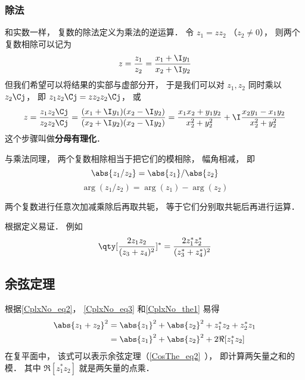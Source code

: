 \subsubsection{除法}
和实数一样， 复数的除法定义为乘法的逆运算． 令 $z_1 = z z_2$ （$z_2 \ne 0$）， 则两个复数相除可以记为
\begin{equation}
z = \frac{z_1}{z_2} = \frac{x_1 + \I y_1}{x_2 + \I y_2}
\end{equation}
但我们希望可以将结果的实部与虚部分开， 于是我们可以对 $z_1, z_2$ 同时乘以 $z_2\Cj$， 即 $z_1 z_2\Cj  = z z_2 z_2\Cj$， 或
\begin{equation}\label{CplxNo_eq7}
z = \frac{z_1 z_2\Cj}{z_2 z_2\Cj}
= \frac{(x_1 + \I y_1)(x_2 - \I y_2)}{(x_2 + \I y_2)(x_2 - \I y_2)}
= \frac{x_1 x_2 + y_1 y_2}{x_2^2 + y_2^2} + \I \frac{x_2 y_1 - x_1 y_2}{x_2^2 + y_2^2}
\end{equation}
这个步骤叫做\textbf{分母有理化}．

与乘法同理， 两个复数相除相当于把它们的模相除， 幅角相减， 即
\begin{equation}
\abs{z_1/z_2} = \abs{z_1}/\abs{z_2}
\end{equation}
\begin{equation}
\arg(z_1/z_2) = \arg(z_1) - \arg(z_2)
\end{equation}

\begin{theorem}{}\label{CplxNo_the1}
两个复数进行任意次加减乘除后再取共轭， 等于它们分别取共轭后再进行运算．
\end{theorem}
根据定义易证． 例如
\begin{equation}
\qty[\frac{2 z_1 z_2}{(z_3 + z_4)^2}]^* = \frac{2 z_1^* z_2^*}{(z_3^* + z_4^*)^2}
\end{equation}

\subsection{余弦定理}
根据\autoref{CplxNo_eq2}， \autoref{CplxNo_eq3} 和\autoref{CplxNo_the1} 易得
\begin{equation}
\begin{aligned}
\abs{z_1 + z_2}^2 &= \abs{z_1}^2 + \abs{z_2}^2 + z_1^* z_2 + z_2^* z_1\\
&= \abs{z_1}^2 + \abs{z_2}^2 + 2\Re[z_1^* z_2]
\end{aligned}
\end{equation}
在复平面中， 该式可以表示余弦定理（\autoref{CosThe_eq2}~）， 即计算两矢量之和的模． 其中 $\Re[z_1^* z_2]$ 就是两矢量的点乘．
